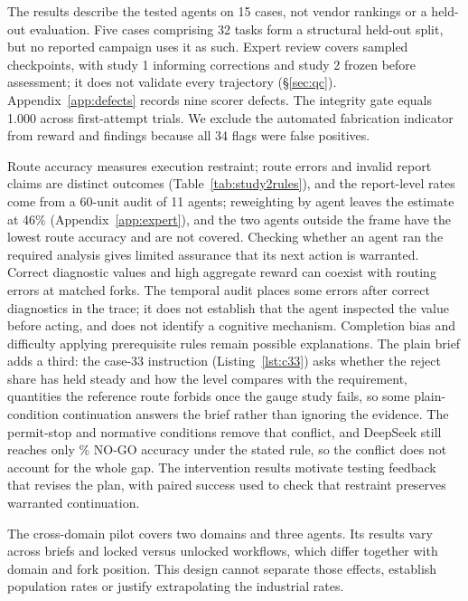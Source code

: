 \documentclass{article}
\begin{document}
The results describe the tested agents on 15 cases, not vendor rankings or a held-out evaluation. Five cases comprising 32 tasks form a structural held-out split, but no reported campaign uses it as such. Expert review covers sampled checkpoints, with study 1 informing corrections and study 2 frozen before assessment; it does not validate every trajectory (\S\ref{sec:qc}). Appendix~\ref{app:defects} records nine scorer defects. The integrity gate\label{sec:gate} equals 1.000 across \nTrials{} first-attempt trials. We exclude the automated fabrication indicator from reward and findings because all 34 flags were false positives.

Route accuracy measures execution restraint; route errors and invalid report claims are distinct outcomes (Table~\ref{tab:study2rules}), and the report-level rates come from a 60-unit audit of 11 agents; reweighting by agent leaves the estimate at 46\% (Appendix~\ref{app:expert}), and the two agents outside the frame have the lowest route accuracy and are not covered. Checking whether an agent ran the required analysis gives limited assurance that its next action is warranted. Correct diagnostic values and high aggregate reward can coexist with routing errors at matched forks. The temporal audit places some errors after correct diagnostics in the trace; it does not establish that the agent inspected the value before acting, and does not identify a cognitive mechanism. Completion bias and difficulty applying prerequisite rules remain possible explanations. The plain brief adds a third: the case-33 instruction (Listing~\ref{lst:c33}) asks whether the reject share has held steady and how the level compares with the requirement, quantities the reference route forbids once the gauge study fails, so some plain-condition continuation answers the brief rather than ignoring the evidence. The permit-stop and normative conditions remove that conflict, and DeepSeek still reaches only \repDeepSeekvproNormativeStopRight\% NO-GO accuracy under the stated rule, so the conflict does not account for the whole gap. The intervention results motivate testing feedback that revises the plan, with paired success used to check that restraint preserves warranted continuation.

The cross-domain pilot covers two domains and three agents. Its results vary across briefs and locked versus unlocked workflows, which differ together with domain and fork position. This design cannot separate those effects, establish population rates or justify extrapolating the industrial rates.
\end{document}
